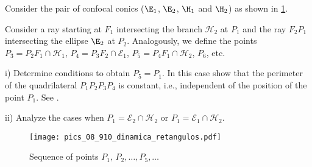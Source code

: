 


\begin{exercise}\label{exerc:08-02-periodicsequence} Consider the pair of confocal conics ($\E_1$, $\E_2$, $\H_1$ and $\H_2$) as shown in  \cref{fig:retangulo_exerc82}.

  Consider a ray starting at $F_1$ intersecting the branch $\mathcal{H}_2$ at $P_1$ and  the ray
  $F_2P_1$  intersecting the ellipse $\E_2$  at $P_2$. Analogously, we define the points $P_3=P_2F_1\cap\mathcal{H}_1$, $P_4=P_3F_2\cap\mathcal{E}_1$, $P_5=P_4F_1\cap\mathcal{H}_2$,
  $P_6$, etc.  
  
\noindent i) Determine conditions to obtain $P_5=P_1.$ 
In this case show that the perimeter of the quadrilateral
$P_1P_2P_3P_4$ is constant, i.e., independent of the position of the point $P_1$.  See \cite{dolgirev2014}.


\noindent ii) Analyze the cases when $P_1=\mathcal{E}_2\cap \mathcal{H}_2$ or $P_1=\mathcal{E}_1\cap \mathcal{H}_2$.

 \begin{figure}[H]
 	\begin{center}
 	 \texttt{[image:  pics\_08\_910\_dinamica\_retangulos.pdf]}
 		\caption {Sequence of points $P_1,  \,P_2, \ldots,  P_5 ,  \ldots$  
 		 \label{fig:retangulo_exerc82} }
 	\end{center}
 	\end{figure}
 	
 	\end{exercise}